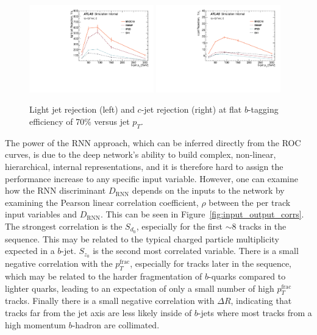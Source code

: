 \begin{figure}[htbp]
  \centering
 \includegraphics[width=0.48\textwidth]{figures/RNN/LRej_FlatEff.pdf}
  \includegraphics[width=0.48\textwidth]{figures/RNN/CRej_FlatEff.pdf}
\caption{Light jet rejection (left) and $c$-jet rejection (right) at flat $b$-tagging efficiency of 70\% versus jet $p_T$.}
  \label{fig:flat_rej_pt}
\end{figure}

The power of the RNN approach, which can be inferred directly from the ROC curves, is due to the deep network’s ability to build complex, non-linear, hierarchical, internal representations, and it is therefore hard to assign the performance increase to any specific input variable.
However, one can examine how the RNN discriminant $D_{\mathrm{RNN}}$ depends on the inputs to the network by examining the Pearson linear correlation coefficient, $\rho$ between the per track input variables and $D_{\mathrm{RNN}}$.  This can be seen in Figure~\ref{fig:input_output_corrs}.  The strongest correlation is the $S_{d_0}$, especially for the first  $\sim8$ tracks in the sequence.  This may be related to the typical charged particle multiplicity expected in a $b$-jet. $S_{z_0}$ is the second most correlated variable. There is a small negative correlation with the $p_T^{\textrm{frac}}$, especially for tracks later in the sequence, which may be related to the harder fragmentation of $b$-quarks compared to lighter quarks, leading to an expectation of only a small number of high $p_T^{\textrm{frac}}$ tracks. Finally there is a small negative correlation with $\Delta R$, indicating that tracks far from the jet axis are less likely inside of $b$-jets where most tracks from a high momentum $b$-hadron are collimated.

